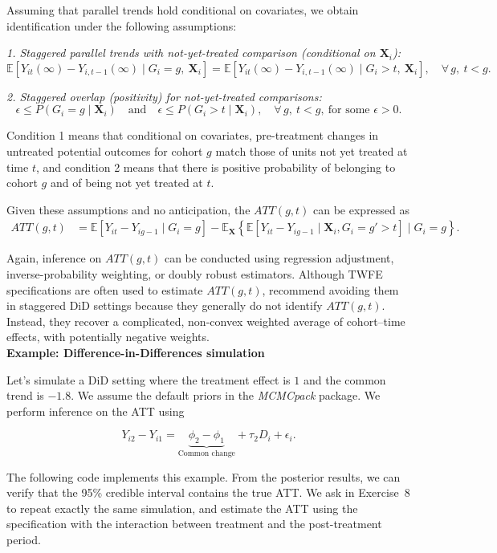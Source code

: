 Assuming that parallel trends hold conditional on covariates, we obtain identification under the following assumptions:

\textit{1. Staggered parallel trends with not-yet-treated comparison (conditional on $\mathbf X_i$):}
\[
\mathbb{E}\!\left[Y_{it}(\infty)-Y_{i,t-1}(\infty)\mid G_i=g,\ \mathbf X_i\right]
=
\mathbb{E}\!\left[Y_{it}(\infty)-Y_{i,t-1}(\infty)\mid G_i>t,\ \mathbf X_i\right],
\quad \forall\, g,\ t<g.
\]

\textit{2. Staggered overlap (positivity) for not-yet-treated comparisons:}
\[
\epsilon \le P(G_i=g \mid \mathbf X_i)
\quad \text{and} \quad
\epsilon \le P(G_i>t \mid \mathbf X_i),
\quad \forall\, g,\ t<g,\ \text{for some } \epsilon>0.
\]

Condition 1 means that conditional on covariates, pre-treatment changes in untreated potential outcomes for cohort $g$ match those of units not yet treated at time $t$, and condition 2 means that there is positive probability of belonging to cohort $g$ and of being not yet treated at $t$.

Given these assumptions and no anticipation, the $ATT(g,t)$ can be expressed as
\begin{align*}
	ATT(g,t) &=\mathbb{E}[Y_{it} - Y_{ig-1} \mid G_i = g]-\mathbb{E}_{\mathbf{X}}\left\{\mathbb{E}[Y_{it} - Y_{ig-1} \mid\mathbf{X}_i,  G_i = g'>t]\mid G_i=g\right\}.
\end{align*}

Again, inference on $ATT(g,t)$ can be conducted using regression adjustment, inverse-probability weighting, or doubly robust estimators. Although TWFE specifications are often used to estimate $ATT(g,t)$, \cite{baker2025did_guide} recommend avoiding them in staggered DiD settings because they generally do not identify $ATT(g,t)$. Instead, they recover a complicated, non-convex weighted average of cohort–time effects, with potentially negative weights.\\

\textbf{Example: Difference-in-Differences simulation}

Let's simulate a DiD setting where the treatment effect is $1$ and the common trend is $-1.8$. We assume the default priors in the \textit{MCMCpack} package. We perform inference on the ATT using

\[
Y_{i2} - Y_{i1}
= \underbrace{\phi_2 - \phi_1}_{\text{Common change}}
+ \tau_2 D_i + \epsilon_i.
\]

The following code implements this example. From the posterior results, we can verify that the 95\% credible interval contains the true ATT. We ask in Exercise~8 to repeat exactly the same simulation, and estimate the ATT using the specification with the interaction between treatment and the post-treatment period.

